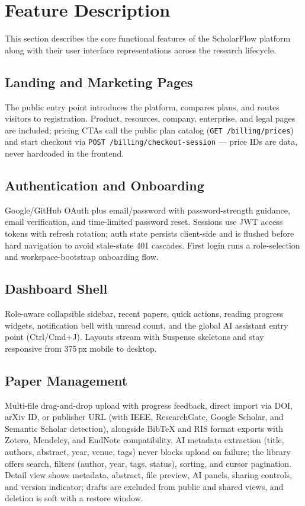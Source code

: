 \section{Feature Description}
This section describes the core functional features of the ScholarFlow platform along with their user interface representations across the research lifecycle.

\subsection{Landing and Marketing Pages}
The public entry point introduces the platform, compares plans, and routes
visitors to registration. Product, resources, company, enterprise, and legal
pages are included; pricing CTAs call the public plan catalog
(\texttt{GET /billing/prices}) and start checkout via
\texttt{POST /billing/checkout-session} --- price IDs are data, never
hardcoded in the frontend.

\subsection{Authentication and Onboarding}
Google/GitHub OAuth plus email/password with password-strength guidance,
email verification, and time-limited password reset. Sessions use JWT access
tokens with refresh rotation; auth state persists client-side and is flushed
before hard navigation to avoid stale-state 401 cascades. First login runs a
role-selection and workspace-bootstrap onboarding flow.

\subsection{Dashboard Shell}
Role-aware collapsible sidebar, recent papers, quick actions, reading
progress widgets, notification bell with unread count, and the global AI
assistant entry point (Ctrl/Cmd+J). Layouts stream with Suspense skeletons
and stay responsive from 375\,px mobile to desktop.

\subsection{Paper Management}
Multi-file drag-and-drop upload with progress feedback, direct import via
DOI, arXiv ID, or publisher URL (with IEEE, ResearchGate, Google Scholar, and
Semantic Scholar detection), alongside BibTeX and RIS format exports with
Zotero, Mendeley, and EndNote compatibility. AI metadata extraction
(title, authors, abstract, year, venue, tags) never blocks upload on failure;
the library offers search, filters (author, year, tags, status), sorting, and
cursor pagination. Detail view shows metadata, abstract, file preview, AI
panels, sharing controls, and version indicator; drafts are excluded from
public and shared views, and deletion is soft with a restore window.

